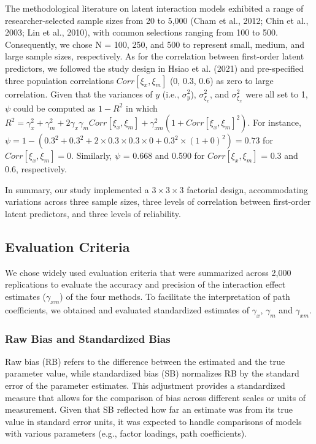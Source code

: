 \documentclass[
  man]{apa6}
\begin{document}
The methodological literature on latent interaction models exhibited a range of researcher-selected sample sizes from 20 to 5,000 (Cham et al., 2012; Chin et al., 2003; Lin et al., 2010), with common selections ranging from 100 to 500. Consequently, we chose N = 100, 250, and 500 to represent small, medium, and large sample sizes, respectively. As for the correlation between first-order latent predictors, we followed the study design in Hsiao et al. (2021) and pre-specified three population correlations \(Corr[{\xi_{x},\xi_{m}}]\) (0, 0.3, 0.6) as zero to large correlation. Given that the variances of \(y\) (i.e., \(\sigma_{y}^2\)), \(\sigma_{\xi_{x}}^2\), and \(\sigma_{\xi_{x}}^2\) were all set to 1, \(\psi\) could be computed as \(1 - R^2\) in which \(R^2 = \gamma_{x}^2 + \gamma_{m}^2 + 2\gamma_{x}\gamma_{m}Corr[{\xi_{x},\xi_{m}}] + \gamma_{xm}^2(1 + Corr[{\xi_{x},\xi_{m}}]^2)\). For instance, \(\psi = 1 - (0.3^2 + 0.3^2 + 2\times0.3\times0.3\times0 + 0.3^2\times(1 + 0)^2) = 0.73\) for \(Corr[{\xi_{x},\xi_{m}}] = 0\). Similarly, \(\psi\) = 0.668 and 0.590 for \(Corr[{\xi_{x},\xi_{m}}]\) = 0.3 and 0.6, respectively.

In summary, our study implemented a \(3 \times 3 \times 3\) factorial design, accommodating variations across three sample sizes, three levels of correlation between first-order latent predictors, and three levels of reliability.

\subsection{Evaluation Criteria}\label{evaluation-criteria}

We chose widely used evaluation criteria that were summarized across 2,000 replications to evaluate the accuracy and precision of the interaction effect estimates (\(\gamma_{xm}\)) of the four methods. To facilitate the interpretation of path coefficients, we obtained and evaluated standardized estimates of \(\gamma_{x}\), \(\gamma_{m}\) and \(\gamma_{xm}\).

\subsubsection{Raw Bias and Standardized Bias}\label{raw-bias-and-standardized-bias}

Raw bias (RB) refers to the difference between the estimated and the true parameter value, while standardized bias (SB) normalizes RB by the standard error of the parameter estimates. This adjustment provides a standardized measure that allows for the comparison of bias across different scales or units of measurement. Given that SB reflected how far an estimate was from its true value in standard error units, it was expected to handle comparisons of models with various parameters (e.g., factor loadings, path coefficients).
\end{document}
